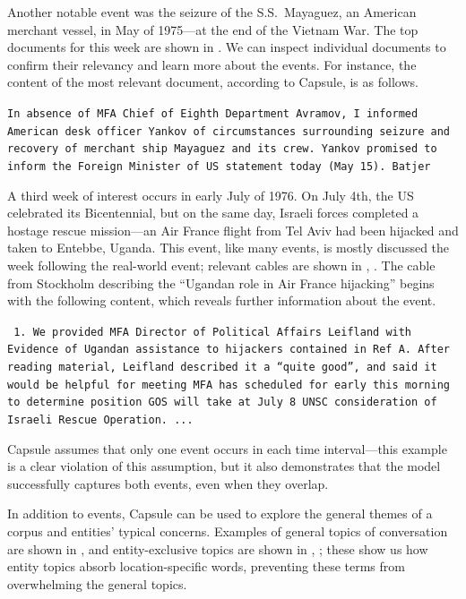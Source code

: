 Another notable event was the seizure of the S.S.~Mayaguez, an American merchant vessel, in May of 1975---at the end of the Vietnam War.  The top documents for this week
are shown in .  We can inspect individual documents to confirm their relevancy and learn more about the events.  For instance, the content of the most relevant document, according to Capsule, is as follows.
\begin{shaded*} \tt{In absence of MFA Chief of Eighth Department Avramov, I
informed American desk officer Yankov of circumstances surrounding seizure
and recovery of merchant ship Mayaguez and its crew.  Yankov promised to 
inform the Foreign Minister of US statement today  (May 15).
Batjer
}
\end{shaded*}


A third week of interest occurs in early July of 1976.  On July 4th, the US celebrated its Bicentennial, but on the same day, Israeli forces completed a hostage rescue mission---an Air France flight from Tel Aviv had been hijacked and taken to Entebbe, Uganda.  This event, like many events, is mostly discussed the week following the real-world event; relevant cables are shown in , .
The cable from Stockholm describing the ``Ugandan role in Air France hijacking'' begins with the following content, which reveals further information about the event.
\begin{shaded*} \tt{
1. We provided MFA Director of Political Affairs
Leifland with Evidence of Ugandan assistance to 
hijackers contained in Ref A.  After reading material,{}
Leifland described it a ``quite good'', and said it{}
would be helpful for meeting MFA has scheduled for 
early this morning to determine position GOS will take
at July 8 UNSC consideration of Israeli Rescue Operation. ...
}
\end{shaded*}
Capsule assumes that only one event occurs in each time interval---this example is a clear violation of this assumption, but it also demonstrates that the model successfully captures both events, even when they overlap.


In addition to events, Capsule can be used to explore the general themes of a corpus and entities' typical concerns.  Examples of general topics of conversation are shown in ,  and entity-exclusive topics are shown in , ; these show us how entity topics absorb location-specific words, preventing these terms from overwhelming the general topics.

